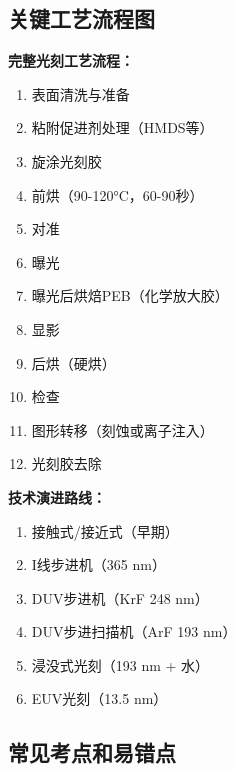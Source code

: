 \documentclass[UTF8,12pt,a4paper]{ctexart}
\begin{document}
\subsection{关键工艺流程图}

\textbf{完整光刻工艺流程：}
\begin{enumerate}
    \item 表面清洗与准备
    \item 粘附促进剂处理（HMDS等）
    \item 旋涂光刻胶
    \item 前烘（90-120°C，60-90秒）
    \item 对准
    \item 曝光
    \item 曝光后烘焙PEB（化学放大胶）
    \item 显影
    \item 后烘（硬烘）
    \item 检查
    \item 图形转移（刻蚀或离子注入）
    \item 光刻胶去除
\end{enumerate}

\textbf{技术演进路线：}
\begin{enumerate}
    \item 接触式/接近式（早期）
    \item I线步进机（365 nm）
    \item DUV步进机（KrF 248 nm）
    \item DUV步进扫描机（ArF 193 nm）
    \item 浸没式光刻（193 nm + 水）
    \item EUV光刻（13.5 nm）
\end{enumerate}

\subsection{常见考点和易错点}
\end{document}

